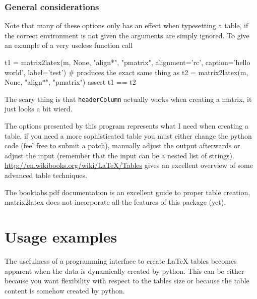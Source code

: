 \subsubsection{General considerations}
Note that many of these options only has an effect when typesetting a table,
if the correct environment is not given the arguments are simply ignored.
To give an example of a very useless function call
\begin{pygments}
t1 = matrix2latex(m, None, "align*", "pmatrix",
                 alignment='rc',
                 caption='hello world',
                 label='test')
# produces the exact same thing as
t2 = matrix2latex(m, None, "align*", "pmatrix")
assert t1 == t2
\end{pygments}
The scary thing is that \lstinline{headerColumn} actually works when creating a matrix,
it just looks a bit wierd.

The options presented by this program represents what I need when creating a table,
if you need a more sophisticated table you must either change the python code
(feel free to submit a patch), manually adjust the output afterwards
or adjust the input (remember that the input can be a nested list of strings).
\url{http://en.wikibooks.org/wiki/LaTeX/Tables} gives an excellent overview
of some advanced table techniques.

The booktabs.pdf documentation is an excellent guide to proper table creation,
matrix2latex does not incorporate all the features of this package (yet).

\section{Usage examples}
The usefulness of a programming interface to create \LaTeX{}
tables becomes apparent when the data is dynamically created by python.
This can be either because you want flexibility with respect to the tables size
or because the table content is somehow created by python.

